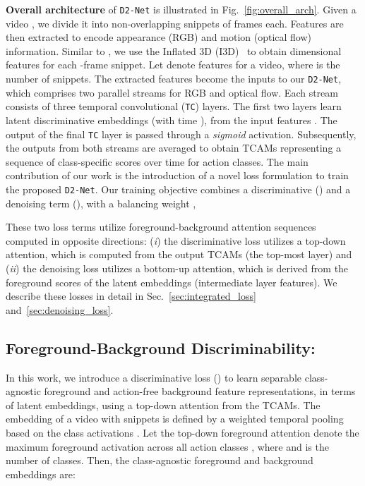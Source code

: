 \documentclass[10pt,twocolumn,letterpaper]{article}
\def\proposed{\texttt{D2-Net}{}}
\begin{document}
\noindent\textbf{Overall architecture} of \proposed{} is illustrated in Fig.~\ref{fig:overall_arch}. Given a video , we divide it into non-overlapping snippets of  frames each. Features are then extracted to encode appearance (RGB) and motion (optical flow) information. Similar to \cite{stpn,wtalc,3cnet}, we use the Inflated 3D (I3D)~\cite{kinetics} to obtain  dimensional features for each -frame snippet. Let  denote features for a video, where  is the number of snippets. The extracted features become the inputs to our \proposed{}, which comprises two parallel streams for RGB and optical flow. Each stream consists of three temporal convolutional (\texttt{TC}) layers. The first two layers learn latent discriminative embeddings  (with time ), from the input features . The output of the final \texttt{TC} layer is passed through a \textit{sigmoid} activation. Subsequently, the outputs from both streams are averaged to obtain TCAMs  representing a sequence of class-specific scores over time for  action classes. 
The main contribution of our work is the introduction of a novel loss formulation to train the proposed \proposed. 
Our training objective combines a discriminative () and a denoising term (), with a balancing weight ,

These two loss terms utilize foreground-background attention sequences computed in opposite directions: (\textit{i}) the discriminative loss  utilizes a top-down attention, which is computed from the output TCAMs (the top-most layer) and (\textit{ii}) the denoising loss  utilizes a bottom-up attention, which is derived from the foreground scores of the latent embeddings (intermediate layer features). 
We describe these losses in detail in Sec.~\ref{sec:integrated_loss} and~\ref{sec:denoising_loss}.




\subsection{\hspace{-0.07em}Foreground-Background Discriminability:\label{sec:integrated_loss}}
In this work, we introduce a discriminative loss () to learn separable class-agnostic foreground and action-free background feature representations, in terms of latent embeddings, using a top-down attention from the TCAMs. 
The embedding of a video with  snippets is defined by a weighted temporal pooling based on the class activations .
Let the top-down foreground attention  denote the maximum foreground activation across all action classes , where  and  is the number of classes. Then, the class-agnostic foreground and background embeddings are:
\end{document}
